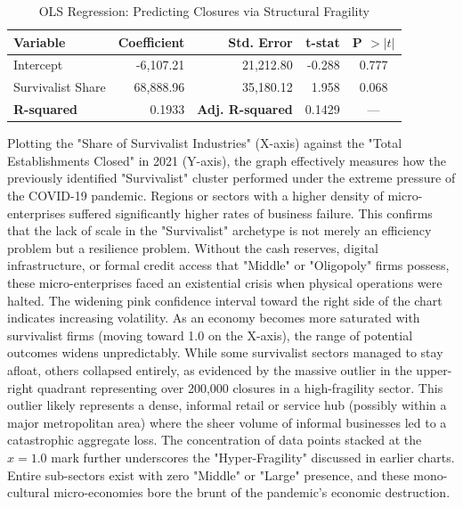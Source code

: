 \documentclass[acmtog, nonacm]{acmart}
\begin{document}
\begin{table}[ht]
  \caption{OLS Regression: Predicting Closures via Structural Fragility}
  \label{tab:ols_results}
  \begin{tabularx}{\linewidth}{l r r r c}
    \toprule
    \textbf{Variable} & \textbf{Coefficient} & \textbf{Std. Error} & \textbf{t-stat} & \textbf{P $> |t|$} \\
    \midrule
    Intercept & -6,107.21 & 21,212.80 & -0.288 & 0.777 \\
    Survivalist Share & 68,888.96 & 35,180.12 & 1.958 & 0.068 \\
    \midrule
    \textbf{R-squared} & 0.1933 & \textbf{Adj. R-squared} & 0.1429 & --- \\
    \bottomrule
  \end{tabularx}
\end{table}

Plotting the "Share of Survivalist Industries" (X-axis) against the "Total Establishments Closed" in 2021 (Y-axis), the graph effectively measures how the previously identified "Survivalist" cluster performed under the extreme pressure of the COVID-19 pandemic. Regions or sectors with a higher density of micro-enterprises suffered significantly higher rates of business failure. This confirms that the lack of scale in the "Survivalist" archetype is not merely an efficiency problem but a resilience problem. Without the cash reserves, digital infrastructure, or formal credit access that "Middle" or "Oligopoly" firms possess, these micro-enterprises faced an existential crisis when physical operations were halted. The widening pink confidence interval toward the right side of the chart indicates increasing volatility. As an economy becomes more saturated with survivalist firms (moving toward 1.0 on the X-axis), the range of potential outcomes widens unpredictably. While some survivalist sectors managed to stay afloat, others collapsed entirely, as evidenced by the massive outlier in the upper-right quadrant representing over 200,000 closures in a high-fragility sector. This outlier likely represents a dense, informal retail or service hub (possibly within a major metropolitan area) where the sheer volume of informal businesses led to a catastrophic aggregate loss. The concentration of data points stacked at the $x=1.0$ mark further underscores the "Hyper-Fragility" discussed in earlier charts. Entire sub-sectors exist with zero "Middle" or "Large" presence, and these mono-cultural micro-economies bore the brunt of the pandemic's economic destruction.
\end{document}
